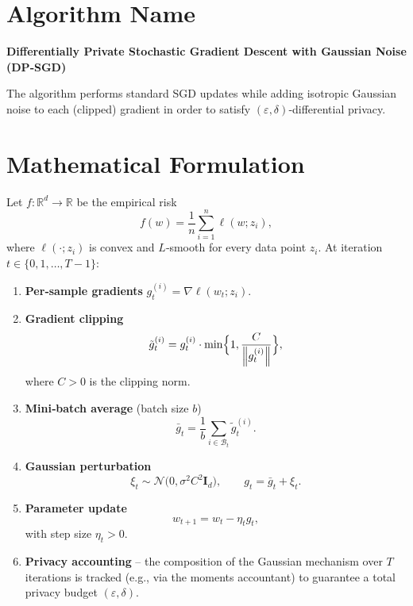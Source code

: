 \documentclass[11pt]{article}
\newcommand{\R}{\mathbb{R}}
\newcommand{\norm}[1]{\left\lVert#1\right\rVert}
\newcommand{\grad}{\nabla}
\begin{document}
\section*{Algorithm Name}
\textbf{Differentially Private Stochastic Gradient Descent with Gaussian Noise (DP‑SGD)}  

The algorithm performs standard SGD updates while adding isotropic Gaussian noise to each (clipped) gradient in order to satisfy $(\varepsilon,\delta)$‑differential privacy.

\section*{Mathematical Formulation}
Let $f:\R^{d}\to\R$ be the empirical risk
\[
f(w)=\frac{1}{n}\sum_{i=1}^{n} \ell(w;z_i),
\]
where $\ell(\cdot;z_i)$ is convex and $L$‑smooth for every data point $z_i$.  
At iteration $t\in\{0,1,\dots,T-1\}$:

\begin{enumerate}[label=\arabic*.]
\item \textbf{Per‑sample gradients} $g_t^{(i)}=\grad\ell(w_t;z_i)$.
\item \textbf{Gradient clipping} 
\[
\tilde g_t^{(i)} = g_t^{(i)}\cdot\min\Bigl\{1,\frac{C}{\norm{g_t^{(i)}}}\Bigr\},
\]
where $C>0$ is the clipping norm.
\item \textbf{Mini‑batch average} (batch size $b$)
\[
\bar g_t = \frac{1}{b}\sum_{i\in\mathcal B_t}\tilde g_t^{(i)} .
\]
\item \textbf{Gaussian perturbation}
\[
\xi_t\sim\mathcal N\bigl(0,\sigma^{2}C^{2}\mathbf I_d\bigr),\qquad 
g_t = \bar g_t + \xi_t .
\]
\item \textbf{Parameter update}
\[
w_{t+1}=w_t-\eta_t g_t ,
\]
with step size $\eta_t>0$.
\item \textbf{Privacy accounting} – the composition of the Gaussian mechanism over $T$ iterations is tracked (e.g., via the moments accountant) to guarantee a total privacy budget $(\varepsilon,\delta)$.
\end{enumerate}
\end{document}
